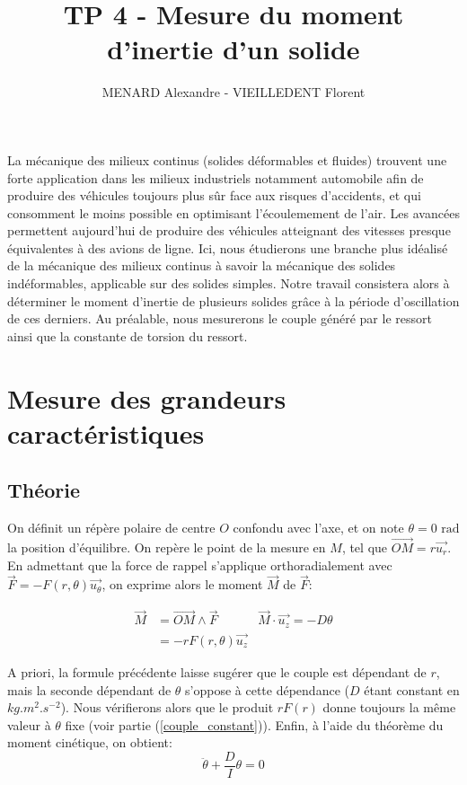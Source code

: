 \documentclass[11pt]{article}
\title{\vspace{-2cm}\textbf{TP 4 - Mesure du moment d'inertie d'un solide}}
\author{\vspace{-0.5cm}MENARD Alexandre - VIEILLEDENT Florent}
\date{\vspace{-0.7cm}}
\newcommand{\ut}{\vec{u_\theta}}
\newcommand{\ur}{\vec{u_r}}
\newcommand{\uz}{\vec{u_z}}
\begin{document}
\maketitle

La mécanique des milieux continus (solides déformables et fluides) trouvent une forte application dans les milieux industriels notamment automobile afin de produire
des véhicules toujours plus sûr face aux risques d'accidents, et qui consomment le moins possible en optimisant l'écoulemement de l'air. Les avancées permettent aujourd'hui
de produire des véhicules atteignant des vitesses presque équivalentes à des avions de ligne. Ici, nous étudierons une branche plus idéalisé de la mécanique des milieux continus à savoir la mécanique des solides
indéformables, applicable sur des solides simples. Notre travail consistera alors à déterminer le moment d'inertie de plusieurs solides grâce à la période d'oscillation de ces derniers. Au préalable,
nous mesurerons le couple généré par le ressort ainsi que la constante de torsion du ressort.

\section{Mesure des grandeurs caractéristiques}
\subsection{Théorie}
On définit un répère polaire de centre $O$ confondu avec l'axe, et on note $\theta=0 \text{ rad}$ la position d'équilibre. On repère le point
de la mesure en $M$, tel que $\vec{OM} = r\ur$. En admettant que la force de rappel
s'applique orthoradialement avec $\vec{F} = -F(r, \theta) \ut$, on exprime alors le moment $\vec{M}$ de $\vec{F}$:

\begin{align}
    \vec{M} & = \vec{OM} \wedge \vec{F} & \vec{M} \cdot \uz = -D\theta \\
            & = -rF(r, \theta) \uz \nonumber
    \label{eqn:moment_ressort}
\end{align}

A priori, la formule précédente laisse sugérer que le couple est dépendant de $r$, mais la seconde dépendant de $\theta$
s'oppose à cette dépendance ($D$ étant constant en $kg.m^2.s^{-2}$). Nous vérifierons alors que le produit $rF(r)$ donne toujours la même valeur à $\theta$ fixe (voir partie (\ref{couple_constant})).
Enfin, à l'aide du théorème du moment cinétique, on obtient:
\begin{equation}
    \label{eqn:equa_diff}
    \ddot \theta + \frac{D}{I}\theta = 0
\end{equation}
\end{document}

